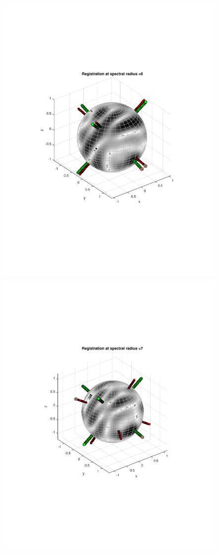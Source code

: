 \documentclass{UCF_ETD}
\begin{document}
\begin{figure}[H]
\begin{center}
\includegraphics[scale=0.32]{RobustRegistration/NoisyTransReg_6}
\includegraphics[scale=0.32]{RobustRegistration/NoisyTransReg_7}

\end{center}
\end{figure}
\end{document}

